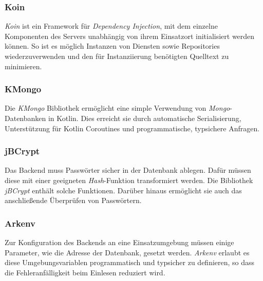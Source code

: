\documentclass[a4paper, 11pt]{article}
\begin{document}
\subsubsection{Koin}
\label{subsubsec:backend:bibs:koin}
\textit{Koin} ist ein Framework für \textit{Dependency Injection}, mit dem einzelne Komponenten des Servers unabhängig von ihrem Einsatzort initialisiert werden können.
So ist es möglich Instanzen von Diensten sowie Repositories wiederzuverwenden und den für Instanziierung benötigten Quelltext zu minimieren.

\subsubsection{KMongo}
\label{subsubsec:backend:bibs:kmongo}
Die \textit{KMongo} Bibliothek ermöglicht eine simple Verwendung von \textit{Mongo}-Datenbanken in Kotlin.
Dies erreicht sie durch automatische Serialisierung, Unterstützung für Kotlin Coroutines und programmatische, typsichere Anfragen.

\subsubsection{jBCrypt}
\label{subsubsec:backend:bibs:jbcrypt}
Das Backend muss Passwörter sicher in der Datenbank ablegen.
Dafür müssen diese mit einer geeigneten \textit{Hash}-Funktion transformiert werden.
Die Bibliothek \textit{jBCrypt} enthält solche Funktionen.
Darüber hinaus ermöglicht sie auch das anschließende Überprüfen von Passwörtern.

\subsubsection{Arkenv}
\label{subsubsec:backend:bibs:arkenv}
Zur Konfiguration des Backends an eine Einsatzumgebung müssen einige Parameter, wie die Adresse der Datenbank, gesetzt werden.
\textit{Arkenv} erlaubt es diese Umgebungsvariablen programmatisch und typsicher zu definieren, so dass die Fehleranfälligkeit beim Einlesen reduziert wird.
\end{document}
